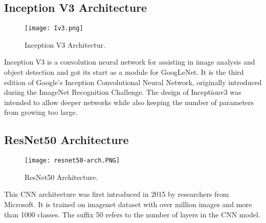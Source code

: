 \documentclass[conference]{IEEEtran}
\begin{document}
\subsection{Inception V3 Architecture}\label{SCM}

\begin{figure}[htbp]
\centering
\texttt{[image: Iv3.png]}
\caption{Inception V3 Architectur.}
\label{fig}
\end{figure}

Inception V3 is a convolution neural network for assisting in image analysis and object detection and got its start as a module for GoogLeNet. It is the third edition of Google's Inception Convolutional Neural Network, originally introduced during the ImageNet Recognition Challenge. The design of Inceptionv3 was intended to allow deeper networks while also keeping the number of parameters from growing too large.




\subsection{ResNet50 Architecture}\label{SCM}

\begin{figure}[htbp]
\centering
\texttt{[image: resnet50-arch.PNG]}
\caption{ResNet50 Architecture.}
\label{fig}
\end{figure}

This CNN architecture was first introduced in 2015 by researchers from Microsoft. It is trained on imagenet dataset with over  million images and more than 1000 classes. The suffix 50 refers to the number of layers in the CNN model. 
\end{document}
